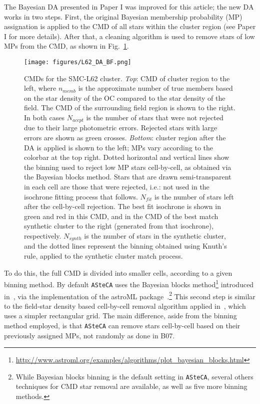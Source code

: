 \documentclass{aa}
\begin{document}
The Bayesian DA presented in Paper I was improved for this article; the new DA
works in two steps. First, the original Bayesian membership probability (MP)
assignation is applied to the CMD of all stars within the cluster region (see
Paper I for more details).\@
%
After that, a cleaning algorithm is used to remove stars of low MPs from the
CMD, as shown in Fig.~\ref{fig:DA_BF}.
%
\begin{figure}
\centering
\texttt{[image: figures/L62\_DA\_BF.png]}
\caption{CMDs for the SMC-L62 cluster. \emph{Top}: CMD of cluster region to the
left, where $n_{memb}$ is the approximate number of true members based on the
star density of the OC compared to the star density of the field. The CMD of the
surrounding field region is shown to the right. In both cases $N_{accpt}$ is
the number of stars that were not rejected due to their large photometric
errors. Rejected stars with large errors are shown as green crosses.
\emph{Bottom}: cluster region after the DA is applied is shown to the left;
MPs vary according to the colorbar at the top right.
Dotted horizontal and vertical lines show the binning used to reject low MP
stars cell-by-cell, as obtained via the Bayesian blocks
method. Stars that are drawn semi-transparent in each cell are those that were
rejected, i.e.: not used in the isochrone fitting process that follows.
$N_{fit}$ is the number of stars left after the cell-by-cell rejection.
The best fit isochrone is shown in green and red in this CMD, and in the CMD of
the best match synthetic cluster to the right (generated from that isochrone),
respectively. $N_{synth}$ is the number of stars in the synthetic cluster, and
the dotted lines represent the binning obtained using Knuth's rule, applied to
the synthetic cluster match process.}
\label{fig:DA_BF}
\end{figure}
%
To do this, the full CMD is divided into smaller cells, according to a
given binning method. By default \texttt{ASteCA} uses the Bayesian blocks
method\footnote{\url{http://www.astroml.org/examples/algorithms/plot_bayesian_blocks.html}}
introduced in~\cite{Scargle_2013}, via the implementation of the astroML
package~\citep{Vanderplas_2012}.\footnote{While Bayesian blocks binning is the
default setting in \texttt{ASteCA}, several others techniques for CMD star
removal are available, as well as five more binning methods.}
This second step is similar to the field-star density based cell-by-cell removal
algorithm applied in~\citet[][B07]{Bonatto_2007}, which uses a simpler
rectangular grid.
%
The main difference, aside from the binning method employed, is that
\texttt{ASteCA} can remove stars cell-by-cell based on their previously assigned
MPs, not randomly as done in B07.
\end{document}
